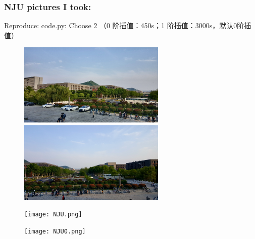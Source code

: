 \documentclass[a4paper,UTF8]{article}
\numberwithin{equation}{section}
\begin{document}
\subsubsection{NJU pictures I took:}
Reproduce:
code.py: Choose $2$ （0 阶插值：450s；1 阶插值：3000s，默认0阶插值）
\begin{figure}[!h]
\centering
\begin{minipage}[t]{0.48\textwidth}
\centering
\includegraphics[width=7cm]{NJU1.png}
\end{minipage}
\begin{minipage}[t]{0.48\textwidth}
\centering
\includegraphics[width=7cm]{NJU2.png}
\end{minipage}
\end{figure}
\begin{figure}[th]
	\centering  %
	\texttt{[image: NJU.png]}  %
\end{figure}
\begin{figure}[th]
	\centering  %
	\texttt{[image: NJU0.png]}  %
\end{figure}

\newpage
\end{document}
